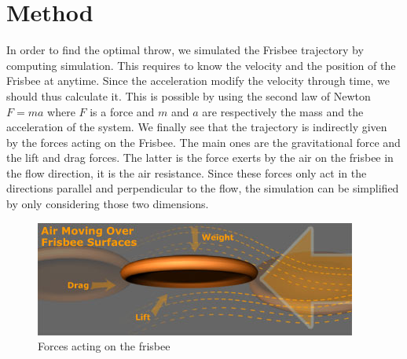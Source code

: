\documentclass[10pt,a4paper]{report}
\begin{document}
\section{Method}
In order to find the optimal throw, we simulated the Frisbee trajectory by computing simulation. This requires to know the velocity and the position of the Frisbee at anytime. Since the acceleration modify the velocity through time, we should thus calculate it. This is possible by using the second law of Newton $F = ma$ where $F$ is a force and $m$ and $a$ are respectively the mass and the acceleration of the system. We finally see that the trajectory is indirectly given by the forces acting on the Frisbee. The main ones are the gravitational force and the lift and drag forces. The latter is the force exerts by the air on the frisbee in the flow direction, it is the air resistance. Since these forces only act in the directions parallel and perpendicular to the flow, the simulation can be simplified by only considering those two dimensions.

\begin{figure}[h]
\centering
\includegraphics[scale=0.8]{forces.jpg}
\caption{Forces acting on the frisbee}
\label{Forces acting on the frisbee}
\end{figure}
\end{document}
